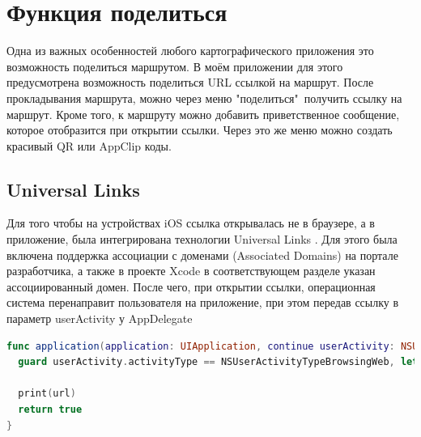 \chapter{Функция поделиться}
  Одна из важных особенностей любого картографического приложения это возможность поделиться маршрутом. В моём приложении для этого предусмотрена возможность поделиться URL ссылкой на маршрут. После прокладывания маршрута, можно через меню "поделиться"\ получить ссылку на маршрут. Кроме того, к маршруту можно добавить приветственное сообщение, которое отобразится при открытии ссылки. Через это же меню можно создать красивый QR или AppClip коды.

  \section{Universal Links}
    Для того чтобы на устройствах iOS ссылка открывалась не в браузере, а в приложение, была интегрирована технологии Universal Links \cite{UniversalLinks}. Для этого была включена поддержка ассоциации с доменами (Associated Domains) на портале разработчика, а также в проекте Xcode в соответствующем разделе указан ассоциированный домен. После чего, при открытии ссылки, операционная система перенаправит пользователя на приложение, при этом передав ссылку в параметр userActivity у AppDelegate

    \begin{lstlisting}[language=swift,caption={Получение ссылки из Universal Links}]
func application(application: UIApplication, continue userActivity: NSUserActivity, restorationHandler: [Any?] -> Void) -> Bool {
  guard userActivity.activityType == NSUserActivityTypeBrowsingWeb, let url = userActivity.webpageURL else { return false }

  print(url)
  return true
}
    \end{lstlisting}

